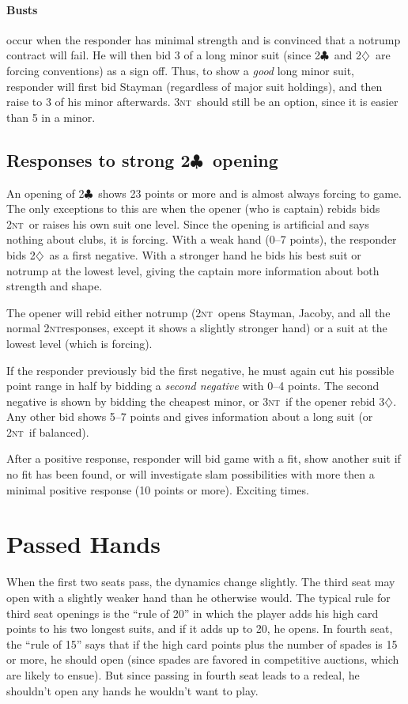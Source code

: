 \documentclass[11pt]{article}
\def\C{$\clubsuit$}
\def\D{$\diamondsuit$}
\def\NT{\textsc{nt}}
\begin{document}
\paragraph{Busts} occur when the responder has minimal strength and is
convinced that a notrump contract will fail.  He will then bid 3 of a
long minor suit (since 2\C\ and 2\D\ are forcing conventions) as a
sign off.  Thus, to show a \emph{good} long minor suit, responder will
first bid Stayman (regardless of major suit holdings), and then raise
to 3 of his minor afterwards.  3\NT\ should still be an option, since
it is easier than 5 in a minor.


\subsection{Responses to strong 2\C\ opening}

An opening of 2\C\ shows 23 points or more and is almost always forcing
to game.  The only exceptions to this are when the opener (who is captain)
rebids bids 2\NT\ or raises his own suit one level.  Since the opening
is artificial and says nothing about clubs, it is forcing.  With a weak
hand (0--7 points), the responder bids 2\D\ as a first negative.  With
a stronger hand he bids his best suit or notrump at the lowest level,
giving the captain more information about both strength and shape.

The opener will rebid either notrump (2\NT\ opens Stayman, Jacoby, and
all the normal 2\NT responses, except it shows a slightly stronger hand)
or a suit at the lowest level (which is forcing).

If the responder previously bid the first negative, he must again cut
his possible point range in half by bidding a \emph{second negative}
with 0--4 points.  The second negative is shown by bidding the
cheapest minor, or 3\NT\ if the opener rebid 3\D.  Any other bid shows
5--7 points and gives information about a long suit (or 2\NT\ if balanced).

After a positive response, responder will bid game with a fit, show another
suit if no fit has been found, or will investigate slam possibilities with
more then a minimal positive response (10 points or more).  Exciting times.


\section{Passed Hands}
When the first two seats pass, the dynamics change slightly.  The
third seat may open with a slightly weaker hand than he otherwise
would.  The typical rule for third seat openings is the ``rule of 20''
in which the player adds his high card points to his two longest
suits, and if it adds up to 20, he opens.  In fourth seat, the ``rule
of 15'' says that if the high card points plus the number of spades is
15 or more, he should open (since spades are favored in competitive
auctions, which are likely to ensue).  But since passing in fourth
seat leads to a redeal, he shouldn't open any hands he wouldn't want
to play.
\end{document}
